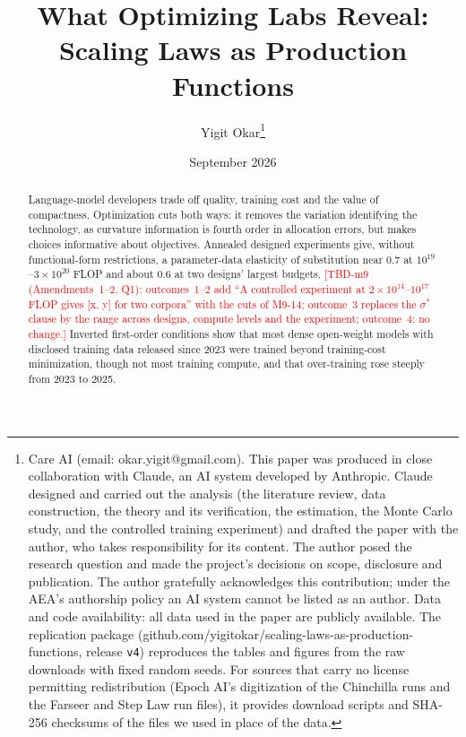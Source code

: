 \documentclass[AER,finalmode]{AEA}
\theoremstyle{definition}
\theoremstyle{remark}
\begin{document}
\title{What Optimizing Labs Reveal: Scaling Laws as Production Functions}
\author{Yigit Okar\thanks{Care AI (email: okar.yigit@gmail.com). This paper was produced in close collaboration
with Claude, an AI system developed by Anthropic. Claude designed and carried out the analysis (the literature review,
data construction, the theory and its verification, the estimation, the Monte Carlo study, and the controlled training
experiment) and drafted the paper with the author, who takes responsibility for its content. The author posed the
research question and made the project's decisions on scope, disclosure and publication. The author gratefully
acknowledges this contribution; under the AEA's authorship policy an AI system cannot be listed as an author. Data and
code availability: all data used in the paper are publicly available. The replication package
(github.com/yigitokar/scaling-laws-as-production-functions, release \texttt{v4}) reproduces the tables and figures from
the raw downloads with fixed random seeds. For sources that carry no license permitting redistribution (Epoch AI's
digitization of the Chinchilla runs and the Farseer and Step Law run files), it provides download scripts and SHA-256
checksums of the files we used in place of the data.}}
\date{September 2026}

\begin{abstract}
Language-model developers trade off quality, training cost and the value of compactness. Optimization cuts both ways:
it removes the variation identifying the technology, as curvature information is fourth order in allocation errors,
but makes choices informative about objectives. Annealed designed experiments give, without functional-form
restrictions, a parameter-data elasticity of substitution near 0.7 at $10^{19}$--$3\times10^{20}$ FLOP and about 0.6
at two designs' largest budgets. \textcolor{red}{[TBD-m9 (Amendments~1--2, Q1): outcomes~1--2 add ``A controlled
experiment at $2\times10^{14}$--$10^{17}$ FLOP gives [x, y] for two corpora'' with the cuts of M9-14; outcome~3 replaces
the $\sigma^*$ clause by the range across designs, compute levels and the experiment; outcome~4: no change.]}
Inverted first-order conditions show that most dense open-weight models with disclosed training data released since
2023 were trained beyond training-cost minimization, though not most training compute, and that over-training rose
steeply from 2023 to 2025.
\end{abstract}
\end{document}
